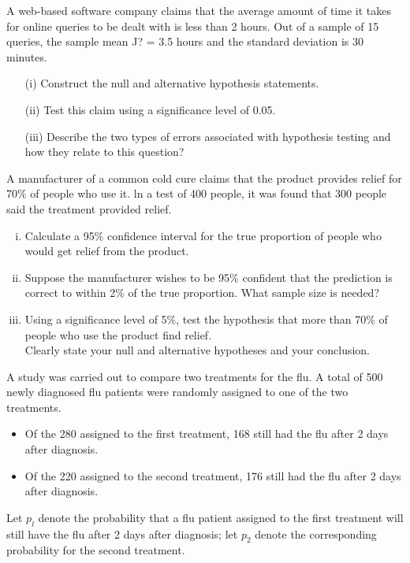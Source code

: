 

\item 
A web-based software company claims that the average amount of time it takes for
online queries to be dealt with is less than 2 hours. Out of a sample of 15 queries, the
sample mean J? = 3.5 hours and the standard deviation is 30 minutes.
\begin{itemize}
	\item[(i)] Construct the null and alternative hypothesis statements.
	\item[(ii)] Test this claim using a significance level of 0.05.
	\item[(iii)] Describe the two types of errors associated with hypothesis testing and how
	they relate to this question?
\end{itemize}


\item 
A manufacturer of a common cold cure claims that the product provides
relief for 70\% of people who use it. ln a test of 400 people, it was found
that 300 people said the treatment provided relief.

\begin{enumerate}[(i)]
	\item Calculate a 95\% confidence interval for the true proportion of
	people who would get relief from the product.
	
	\item Suppose the manufacturer wishes to be 95\% confident that the
	prediction is correct to within 2\% of the true proportion. What
	sample size is needed?
	
	\item Using a significance level of 5\%, test the hypothesis that more than
	70\% of people who use the product find relief.\\ Clearly state your
	null and alternative hypotheses and your conclusion.
\end{enumerate}

\item 
A study was carried out to compare two treatments for the flu. A total of 500
newly diagnosed flu patients were randomly assigned to one of the two treatments.
\begin{itemize}
	\item Of the 280 assigned to the first treatment, 168 still had the flu after 2 days after
	diagnosis. \item Of the 220 assigned to the second treatment, 176 still had the flu after 2
	days after diagnosis. \end{itemize} Let $p_l$ denote the probability that a flu patient assigned to the
first treatment will still have the flu after 2 days after diagnosis; let $p_2$ denote the
corresponding probability for the second treatment.

